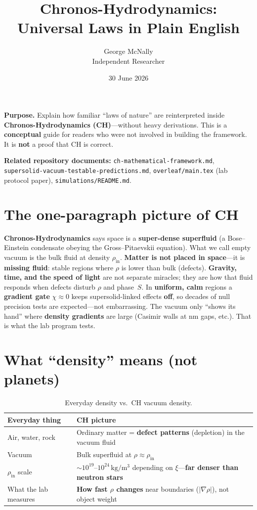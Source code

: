 \documentclass[11pt,a4paper]{article}
\title{%
  Chronos-Hydrodynamics:\\
  Universal Laws in Plain English%
}
\author{%
  George McNally\\[0.25em]
  \small Independent Researcher%
}
\date{30 June 2026}
\begin{document}
\maketitle

\noindent\textbf{Purpose.}
Explain how familiar ``laws of nature'' are reinterpreted inside \textbf{Chronos-Hydrodynamics (CH)}---without heavy derivations.
This is a \textbf{conceptual} guide for readers who were not involved in building the framework.
It is \textbf{not} a proof that CH is correct.

\medskip
\noindent\textbf{Related repository documents:}
\texttt{ch-mathematical-framework.md},
\texttt{supersolid-vacuum-testable-predictions.md},
\texttt{overleaf/main.tex} (lab protocol paper),
\texttt{simulations/README.md}.

\tableofcontents
\newpage

\section{The one-paragraph picture of CH}
\label{sec:picture}

\textbf{Chronos-Hydrodynamics} says space is a \textbf{super-dense superfluid} (a Bose--Einstein condensate obeying the Gross--Pitaevskii equation).
What we call empty vacuum is the bulk fluid at density $\rho_{\mathrm{in}}$.
\textbf{Matter is not placed in space}---it is \textbf{missing fluid}: stable regions where $\rho$ is lower than bulk (defects).
\textbf{Gravity, time, and the speed of light} are not separate miracles; they are how that fluid responds when defects disturb $\rho$ and phase~$S$.
In \textbf{uniform, calm} regions a \textbf{gradient gate} $\chi \approx 0$ keeps supersolid-linked effects \textbf{off}, so decades of null precision tests are expected---not embarrassing.
The vacuum only ``shows its hand'' where \textbf{density gradients} are large (Casimir walls at nm gaps, etc.).
That is what the lab program tests.

\section{What ``density'' means (not planets)}
\label{sec:density}

\begin{table}[htbp]
  \centering
  \small
  \caption{Everyday density vs.\ CH vacuum density.}
  \begin{tabular}{@{}ll@{}}
    \toprule
    Everyday thing & CH picture \\
    \midrule
    Air, water, rock & Ordinary matter = \textbf{defect patterns} (depletion) in the vacuum fluid \\
    Vacuum & Bulk superfluid at $\rho \approx \rho_{\mathrm{in}}$ \\
    $\rho_{\mathrm{in}}$ scale & $\sim 10^{19}$--$10^{24}\,\si{\kilogram\per\meter\cubed}$ depending on $\xi$---\textbf{far denser than neutron stars} \\
    What the lab measures & \textbf{How fast $\rho$ changes} near boundaries ($|\nabla\rho|$), not object weight \\
    \bottomrule
  \end{tabular}
\end{table}
\end{document}
